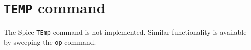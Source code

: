 \section{{\tt TEMP} command}
The Spice {\tt TEmp} command is not implemented.  Similar
functionality is available by sweeping the {\tt op} command.
